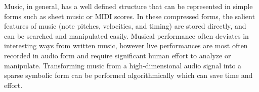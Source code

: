 Music, in general, has a well defined structure that can be represented in simple forms such as sheet music or \ac{MIDI} scores. In these compressed forms, the salient features of music (note pitches, velocities, and timing) are stored directly, and can be searched and manipulated easily. Musical performance often deviates in interesting ways from written music, however live performances are most often recorded in audio form and require significant human effort to analyze or manipulate. Transforming music from a high-dimensional audio signal into a sparse symbolic form can be performed algorithmically which can save time and effort.
